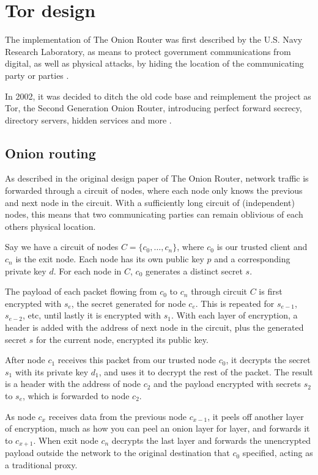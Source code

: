 \documentclass[journal]{IEEEtran}
\begin{document}
		
	\section{Tor design}
		\label{sec:tor}
		The implementation of The Onion Router was first described by the U.S. Navy Research Laboratory, as means to protect government communications from digital, as well as physical attacks, by hiding the location of the communicating party or parties \cite{bib:goldschlag}.
		
		In 2002, it was decided to ditch the old code base and reimplement the project as Tor, the Second Generation Onion Router, introducing perfect forward secrecy, directory servers, hidden services and more \cite{bib:dingledine}.
		
		\subsection{Onion routing}
			As described in the original design paper of The Onion Router, network traffic is forwarded through a circuit of nodes, where each node only knows the previous and next node in the circuit. With a sufficiently long circuit of (independent) nodes, this means that two communicating parties can remain oblivious of each others physical location.
			
			Say we have a circuit of nodes $C = \{c_0, \dots, c_n\}$, where $c_0$ is our trusted client and $c_n$ is the exit node. Each node has its own public key $p$ and a corresponding private key $d$. For each node in $C$, $c_0$ generates a distinct secret $s$.
			
			The payload of each packet flowing from $c_0$ to $c_n$ through circuit $C$ is first encrypted with $s_e$, the secret generated for node $c_e$. This is repeated for $s_{e-1}$, $s_{e-2}$, etc, until lastly it is encrypted with $s_1$. With each layer of encryption, a header is added with the address of next node in the circuit, plus the generated secret $s$ for the current node, encrypted its public key.
			
			After node $c_1$ receives this packet from our trusted node $c_0$, it decrypts the secret $s_1$ with its private key $d_1$, and uses it to decrypt the rest of the packet. The result is a header with the address of node $c_2$ and the payload encrypted with secrets $s_2$ to $s_e$, which is forwarded to node $c_2$.
			
			As node $c_x$ receives data from the previous node $c_{x-1}$, it peels off another layer of encryption, much as how you can peel an onion layer for layer, and forwards it to $c_{x+1}$. When exit node $c_n$ decrypts the last layer and forwards the unencrypted payload outside the network to the original destination that $c_0$ specified, acting as a traditional proxy. 
			
\end{document}
